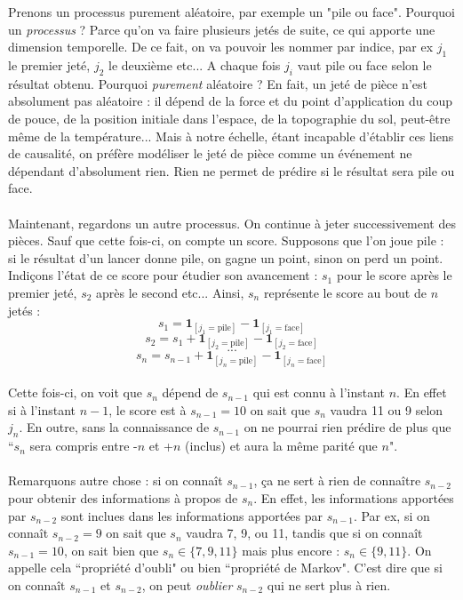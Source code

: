 \documentclass[english]{article}
\begin{document}
Prenons un processus purement aléatoire, par exemple un "pile ou face". Pourquoi un \textit{processus} ? Parce qu'on va faire plusieurs jetés de suite, ce qui apporte une dimension temporelle. De ce fait, on va pouvoir les nommer par indice, par ex $j_1$ le premier jeté, $j_2$ le deuxième etc... A chaque fois $j_i$ vaut pile ou face selon le résultat obtenu. Pourquoi \textit{purement} aléatoire ? En fait, un jeté de pièce n'est absolument pas aléatoire : il dépend de la force et du point d'application du coup de pouce, de la position initiale dans l'espace, de la topographie du sol, peut-\^etre m\^eme de la température... Mais à notre échelle, étant incapable d'établir ces liens de causalité, on préfère modéliser le jeté de pièce comme un événement ne dépendant d'absolument rien. Rien ne permet de prédire si le résultat sera pile ou face. \\
\\
Maintenant, regardons un autre processus. On continue à jeter successivement des pièces. Sauf que cette fois-ci, on compte un score. Supposons que l'on joue pile : si le résultat d'un lancer donne pile, on gagne un point, sinon on perd un point. Indiçons l'état de ce score pour étudier son avancement : $s_1$ pour le score après le premier jeté, $s_2$ après le second etc... Ainsi, $s_n$ représente le score au bout de $n$ jetés :
\[s_1 = \textbf{1}_{[j_1 = \text{pile}]} - \textbf{1}_{[j_1 = \text{face}]}\]
\[s_2 = s_{1} + \textbf{1}_{[j_2 = \text{pile}]} - \textbf{1}_{[j_2 = \text{face}]}\]
\[...\]
\[s_n = s_{n-1} + \textbf{1}_{[j_n = \text{pile}]} - \textbf{1}_{[j_n = \text{face}]}\]
\\
Cette fois-ci, on voit que $s_n$ dépend de $s_{n-1}$ qui est connu à l'instant $n$. En effet si à l'instant $n-1$, le score est à $s_{n-1}=10$ on sait que $s_n$ vaudra 11 ou 9 selon $j_n$. En outre, sans  la connaissance de $s_{n-1}$ on ne pourrai rien prédire de plus que ``$s_n$ sera compris entre -$n$ et +$n$ (inclus) et aura la même parité que $n$". \\
\\
Remarquons autre chose : si on conna\^it $s_{n-1}$, ça ne sert à rien de conna\^itre $s_{n-2}$ pour obtenir des informations à propos de $s_n$. En effet, les informations apportées par $s_{n-2}$ sont inclues dans les informations apportées par $s_{n-1}$. Par ex, si on conna\^it $s_{n-2}=9$ on sait que $s_n$ vaudra 7, 9, ou 11, tandis que si on conna\^it $s_{n-1}=10$, on sait bien que $s_n\in \{7,9,11\}$ mais plus encore : $s_n\in \{9,11\}$. On appelle cela ``propriété d'oubli" ou bien ``propriété de Markov".   C'est dire que si on conna\^ it $s_{n-1}$ et $s_{n-2}$, on peut \textit{oublier} $s_{n-2}$ qui ne sert plus à rien. \\
\end{document}
